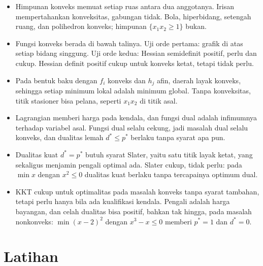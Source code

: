 \begin{ringkasan}
\begin{itemize}
  \item Himpunan konveks memuat setiap ruas antara dua anggotanya. Irisan mempertahankan
        konveksitas, gabungan tidak. Bola, hiperbidang, setengah ruang, dan polihedron
        konveks; himpunan $\{x_{1}x_{2}\ge1\}$ bukan.
  \item Fungsi konveks berada di bawah talinya. Uji orde pertama: grafik di atas setiap
        bidang singgung. Uji orde kedua: Hessian semidefinit positif, perlu dan cukup.
        Hessian definit positif cukup untuk konveks ketat, tetapi tidak perlu.
  \item Pada bentuk baku dengan $f_{i}$ konveks dan $h_{j}$ afin, daerah layak konveks,
        sehingga setiap minimum lokal adalah minimum global. Tanpa konveksitas, titik
        stasioner bisa pelana, seperti $x_{1}x_{2}$ di titik asal.
  \item Lagrangian memberi harga pada kendala, dan fungsi dual adalah infimumnya terhadap
        variabel asal. Fungsi dual selalu cekung, jadi masalah dual selalu konveks, dan
        dualitas lemah $d^{*}\le p^{*}$ berlaku tanpa syarat apa pun.
  \item Dualitas kuat $d^{*}=p^{*}$ butuh syarat Slater, yaitu satu titik layak ketat, yang
        sekaligus menjamin pengali optimal ada. Slater cukup, tidak perlu: pada $\min x$
        dengan $x^{2}\le0$ dualitas kuat berlaku tanpa tercapainya optimum dual.
  \item KKT cukup untuk optimalitas pada masalah konveks tanpa syarat tambahan, tetapi
        perlu hanya bila ada kualifikasi kendala. Pengali adalah harga bayangan, dan celah
        dualitas bisa positif, bahkan tak hingga, pada masalah nonkonveks: $\min (x-2)^{2}$
        dengan $x^{3}-x\le0$ memberi $p^{*}=1$ dan $d^{*}=0$.
\end{itemize}
\end{ringkasan}

\section{Latihan}

